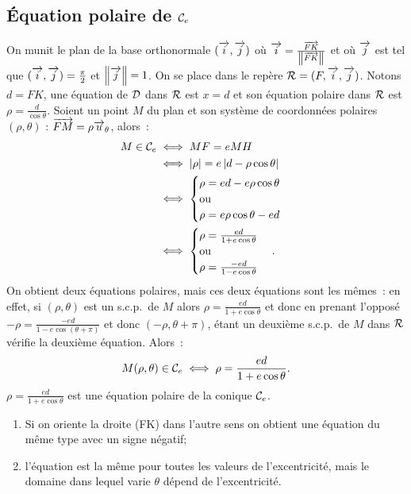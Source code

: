 \subsection{Équation polaire de $\mathcal{C}_{e}$}
On munit le plan de la base orthonormale $(\overrightarrow{i},\overrightarrow{j})$ où $\overrightarrow{i}=\frac{\overrightarrow{FK}}{\left\lVert\overrightarrow{FK}\right\rVert}$ et où $\overrightarrow{j}$ est tel que $(\overrightarrow{i},\overrightarrow{j})=\frac{\pi}{2}$ et $\left\lVert\overrightarrow{j}\right\rVert=1$. On se place dans le repère $\mathcal{R}=(F,\overrightarrow{i},\overrightarrow{j})$. Notons $d=FK$, une équation de $\mathcal{D}$ dans $\mathcal{R}$ est $x=d$ et son équation polaire dans $\mathcal{R}$ est $\rho=\frac{d}{\cos \theta}$. Soient un point $M$ du plan et son système de coordonnées polaires $(\rho,\theta)$ : $\overrightarrow{FM}=\rho\overrightarrow{u}_\theta$, alors~:
\begin{align}
  M \in \mathcal{C}_{e} &\iff MF = e MH \\
  &\iff \left\lvert\rho\right\rvert=e\left\lvert d-\rho \cos\theta\right\rvert\\
  &\iff \begin{cases}\rho = ed-e\rho\cos\theta \\ \text{ou}\\ \rho = e\rho\cos\theta-ed \end{cases} \\
  &\iff  \begin{cases}\rho = \frac{ed}{1+e\cos\theta} \\ \text{ou}\\ \rho = \frac{-ed}{1-e\cos\theta} \end{cases}.
\end{align}
On obtient deux équations polaires, mais ces deux équations sont les mêmes~: en effet, si $(\rho,\theta)$ est un s.c.p.\ de $M$ alors $\rho=\frac{ed}{1+e\cos\theta}$ et donc en prenant l'opposé $-\rho=\frac{-ed}{1-e\cos(\theta+\pi)}$ et donc $(-\rho,\theta+\pi)$, étant un deuxième s.c.p.\ de $M$ dans $\mathcal{R}$ vérifie la deuxième équation. Alors~:
\begin{equation}
  M(\rho,\theta) \in \mathcal{C}_{e} \iff \rho=\frac{ed}{1+e\cos\theta}.
\end{equation}
$\rho=\frac{ed}{1+e\cos\theta}$ est une équation polaire de la conique $\mathcal{C}_{e}$.
\begin{enumerate}
\item Si on oriente la droite (FK) dans l'autre sens on obtient une équation du même type avec un signe négatif;
\item l'équation est la même pour toutes les valeurs de l'excentricité, mais le domaine dans lequel varie $\theta$ dépend de l'excentricité.
\end{enumerate}


